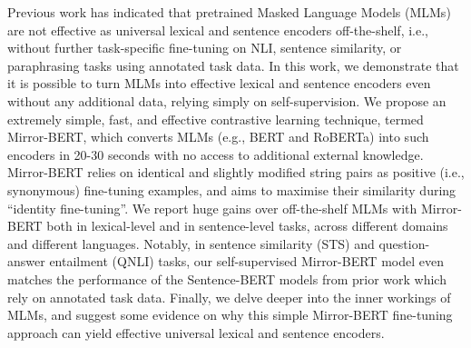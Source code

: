 Previous work has indicated that pretrained Masked Language Models (MLMs) are not effective as universal lexical and sentence encoders off-the-shelf, i.e., without further task-specific fine-tuning on NLI, sentence similarity, or paraphrasing tasks using annotated task data. In this work, we demonstrate that it is possible to turn MLMs into effective lexical and sentence encoders even without any additional data, relying simply on self-supervision. We propose an extremely simple, fast, and effective contrastive learning technique, termed Mirror-BERT, which converts MLMs (e.g., BERT and RoBERTa) into such encoders in 20-30 seconds with no access to additional external knowledge. Mirror-BERT relies on identical and slightly modified string pairs as positive (i.e., synonymous) fine-tuning examples, and aims to maximise their similarity during ``identity fine-tuning''. We report huge gains over off-the-shelf MLMs with Mirror-BERT both in lexical-level and in sentence-level tasks, across different domains and different languages. Notably, in sentence similarity (STS) and question-answer entailment (QNLI) tasks, our self-supervised Mirror-BERT model even matches the performance of the Sentence-BERT models from prior work which rely on annotated task data. Finally, we delve deeper into the inner workings of MLMs, and suggest some evidence on why this simple Mirror-BERT fine-tuning approach can yield effective universal lexical and sentence encoders.
